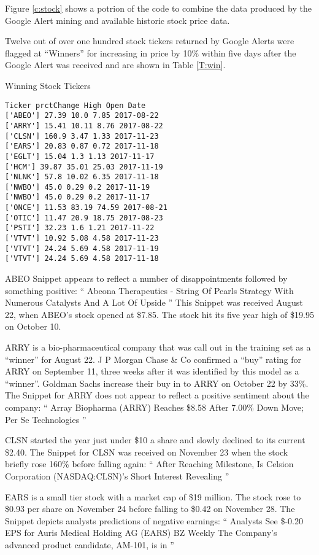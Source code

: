 \documentclass[sigconf]{acmart}
\begin{document}
Figure \ref{c:stock} shows a potrion of the code to combine the data produced by the Google Alert mining and available historic stock price data.

Twelve out of over one hundred stock tickers returned by Google Alerts were flagged at ``Winners'' for increasing in price by 10\% within five days after the Google Alert was received and are shown in Table \ref{T:win}. 
\begin{table}[htb]
\caption{Winning Stock Tickers}\label{T:win}
\begin{verbatim}
Ticker prctChange High Open Date
['ABEO'] 27.39 10.0 7.85 2017-08-22
['ARRY'] 15.41 10.11 8.76 2017-08-22
['CLSN'] 160.9 3.47 1.33 2017-11-23
['EARS'] 20.83 0.87 0.72 2017-11-18
['EGLT'] 15.04 1.3 1.13 2017-11-17
['HCM'] 39.87 35.01 25.03 2017-11-19
['NLNK'] 57.8 10.02 6.35 2017-11-18
['NWBO'] 45.0 0.29 0.2 2017-11-19
['NWBO'] 45.0 0.29 0.2 2017-11-17
['ONCE'] 11.53 83.19 74.59 2017-08-21
['OTIC'] 11.47 20.9 18.75 2017-08-23
['PSTI'] 32.23 1.6 1.21 2017-11-22
['VTVT'] 10.92 5.08 4.58 2017-11-23
['VTVT'] 24.24 5.69 4.58 2017-11-19
['VTVT'] 24.24 5.69 4.58 2017-11-18
\end{verbatim}
\end{table}

ABEO Snippet appears to reflect a number of disappointments followed by something positive:
``
Abeona Therapeutics - String Of Pearls Strategy With Numerous Catalysts And A Lot Of Upside
''
This Snippet was received August 22, when ABEO's stock opened at \$7.85. The stock hit its five year high of \$19.95 on October 10. 

ARRY is a bio-pharmaceutical company that was call out in the training set as a ``winner'' for August 22. J P Morgan Chase \& Co confirmed a ``buy'' rating for ARRY on September 11, three weeks after it was identified by this model as a ``winner''. Goldman Sachs increase their buy in to ARRY  on October 22 by 33\%. The Snippet for ARRY does not appear to reflect a positive sentiment about the company:
``
Array Biopharma (ARRY) Reaches \$8.58 After 7.00\% Down Move; Per Se Technologies
''

CLSN started the year just under \$10 a share and slowly declined to its current \$2.40. The Snippet for CLSN was received on November 23 when the stock briefly rose 160\% before falling again:
``
After Reaching Milestone, Is Celsion Corporation (NASDAQ:CLSN)'s Short Interest Revealing
''

EARS is a small tier stock with a market cap of \$19 million. The stock rose to \$0.93 per share on November 24 before falling to \$0.42 on November 28. The Snippet depicts analysts predictions of negative earnings:
``
Analysts See \$-0.20 EPS for Auris Medical Holding AG (EARS) BZ Weekly The Company's advanced product candidate, AM-101, is in
''
\end{document}
